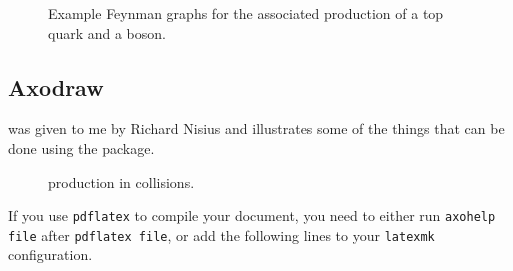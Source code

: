 \begin{figure}[htbp]
\begin{tcblisting}{}
\centering
{}
\quad
{}
\caption{Example Feynman graphs for the associated production
  of a top quark and a \PZ boson.}%
\label{fig:tZq-pyfeyn}
\end{tcblisting}
\end{figure}


\subsection{Axodraw}%
\label{sec:fig:axodraw}

 was given to me by Richard Nisius and illustrates some of the
things that can be done using the  package.

\begin{figure}[htbp]
\begin{tcblisting}{}
\centering

\caption{\ttbar production in \Pp{}\Pp collisions.}%
\label{fig:axodraw:ppttbar}
\end{tcblisting}
\end{figure}
  

If you use \texttt{pdflatex} to compile your document,
you need to either run \texttt{axohelp file} after \texttt{pdflatex file},
or add the following lines to your \texttt{latexmk} configuration.


